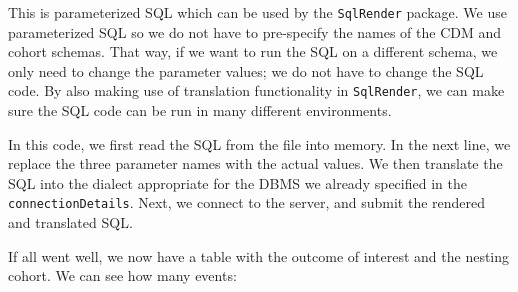 \documentclass[]{article}
\newenvironment{Shaded}{\begin{snugshade}}{\end{snugshade}}
\newcommand{\DataTypeTok}[1]{\textcolor[rgb]{0.13,0.29,0.53}{#1}}
\newcommand{\KeywordTok}[1]{\textcolor[rgb]{0.13,0.29,0.53}{\textbf{#1}}}
\newcommand{\NormalTok}[1]{#1}
\newcommand{\OperatorTok}[1]{\textcolor[rgb]{0.81,0.36,0.00}{\textbf{#1}}}
\newcommand{\StringTok}[1]{\textcolor[rgb]{0.31,0.60,0.02}{#1}}
\begin{document}
This is parameterized SQL which can be used by the \texttt{SqlRender}
package. We use parameterized SQL so we do not have to pre-specify the
names of the CDM and cohort schemas. That way, if we want to run the SQL
on a different schema, we only need to change the parameter values; we
do not have to change the SQL code. By also making use of translation
functionality in \texttt{SqlRender}, we can make sure the SQL code can
be run in many different environments.

\begin{Shaded}
\end{Shaded}

In this code, we first read the SQL from the file into memory. In the
next line, we replace the three parameter names with the actual values.
We then translate the SQL into the dialect appropriate for the DBMS we
already specified in the \texttt{connectionDetails}. Next, we connect to
the server, and submit the rendered and translated SQL.

If all went well, we now have a table with the outcome of interest and
the nesting cohort. We can see how many events:

\begin{Shaded}
\end{Shaded}
\end{document}
